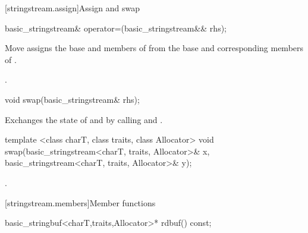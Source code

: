 [stringstream.assign]{Assign and swap}

%
%
\begin{itemdecl}
basic_stringstream& operator=(basic_stringstream&& rhs);
\end{itemdecl}

\begin{itemdescr}
\pnum
\effects Move assigns the base and members of  from the base and corresponding
members of .

\pnum
\returns {}.
\end{itemdescr}

%
%
\begin{itemdecl}
void swap(basic_stringstream& rhs);
\end{itemdecl}

\begin{itemdescr}
\pnum
\effects Exchanges the state of  and
 by calling
 and
.
\end{itemdescr}


%
%
\begin{itemdecl}
template <class charT, class traits, class Allocator>
void swap(basic_stringstream<charT, traits, Allocator>& x,
          basic_stringstream<charT, traits, Allocator>& y);
\end{itemdecl}

\begin{itemdescr}
\pnum
\effects {}.
\end{itemdescr}

[stringstream.members]{Member functions}

%
\begin{itemdecl}
basic_stringbuf<charT,traits,Allocator>* rdbuf() const;
\end{itemdecl}

\begin{itemdescr}
\pnum
\returns
{}
\end{itemdescr}

